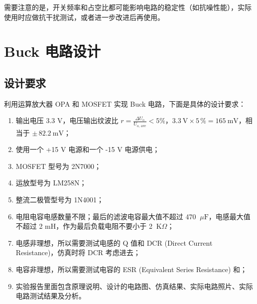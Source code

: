 \documentclass[UTF8]{report}
\def\kO{\ \mathrm{K}\Omega}
\def\uF{\ \mu\mathrm{F}}
\theoremstyle{MyLineTheoremStyle} %
\theoremstyle{MyBlockTheoremStyle} %
\theoremstyle{MySubsubsectionStyle} %
\begin{document}
需要注意的是，开关频率和占空比都可能影响电路的稳定性（如抗噪性能），实际使用时应做抗干扰测试，或者进一步改进后再使用。

\section{Buck 电路设计}

\subsection{设计要求}
利用运算放大器 OPA 和 MOSFET 实现 Buck 电路，下面是具体的设计要求：
\begin{enumerate}
\item 输出电压 3.3 V，电压输出纹波比 $r = \frac{\Delta U_{\text{o}}}{U_{\text{o, ave}}} < 5\%$，$3.3\ \mathrm{V}\times 5\,\% = 165\ \mathrm{mV}$，相当于 $\pm\, 82.2\ \mathrm{mV}$；
\item 使用一个 +15 V 电源和一个 -15 V 电源供电；
\item MOSFET 型号为 2N7000；
\item 运放型号为 LM258N；
\item 整流二极管型号为 1N4001；
\item 电阻电容电感数量不限；最后的滤波电容最大值不超过 470 $\uF$，电感最大值不超过 2 mH，作为最后负载电阻不要小于 2 $\kO$；
\item 电感非理想，所以需要测试电感的 Q 值和 DCR (Direct Current Resistance)，仿真时将 DCR 考虑进去；
\item 电容非理想，所以需要测试电容的 ESR (Equivalent Series Resistance) 和；
\item 实验报告里面包含原理说明、设计的电路图、仿真结果、实际电路照片、实际电路测试结果及分析。
\end{enumerate}
\end{document}
